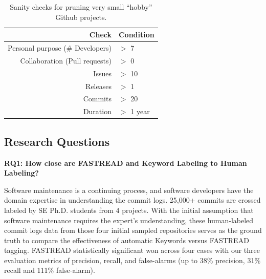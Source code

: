 \documentclass[10pt,conference]{IEEEtran}
\begin{document}
\begin{table}
\small
\caption{Sanity checks for pruning very small ``hobby'' Github projects.}\label{tbl:sanity}
\vspace{-10pt}
 \begin{tabular}{r|l}
Check   & Condition    \\\hline
Personal purpose (\# Developers) & $>$ 7 \\
Collaboration (Pull requests)  & $>$ 0 \\
Issues & $>$ 10 \\
Releases &  $>$ 1 \\
Commits & $>$ 20 \\
Duration  & $>$ 1 year 
\end{tabular}
\vspace{-12pt}
\end{table}



\subsection{Research Questions}



\textbf{RQ1: { How close are FASTREAD and Keyword Labeling to Human Labeling?}}
 
Software maintenance is a continuing process, and software developers have the domain expertise in understanding the commit logs. 25,000+ commits are crossed labeled by SE Ph.D. students from 4 projects. With the initial assumption that software maintenance requires the expert's understanding, these human-labeled commit logs data from those four initial sampled repositories serves as the ground truth to compare the effectiveness of automatic Keywords versus FASTREAD tagging. FASTREAD statistically significant won across four cases with our three evaluation metrics of precision, recall, and false-alarms (up to 38\% precision, 31\% recall and 111\% false-alarm).
 
\end{document}
